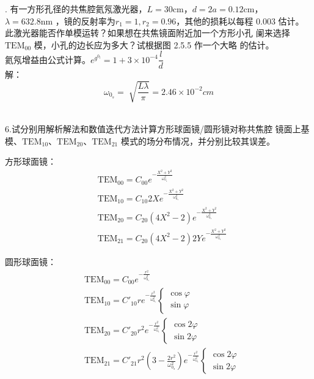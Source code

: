 \documentclass[12pt]{article}
\begin{document}
{. 有一方形孔径的共焦腔氦氖激光器，$L=30\si{\cm}$，$d=2a=0.12\si{\cm}$，
$\lambda=632.8\si{\nm}$ ，镜的反射率为$r_1=1,r_2=0.96$，其他的损耗以每程 0.003 估计。
此激光器能否作单模运转？如果想在共焦镜面附近加一个方形小孔
阑来选择$\mathrm{TEM_{00}}$ 模，小孔的边长应为多大？试根据图 2.5.5 作一个大略
的估计。\\氦氖增益由公式计算。$ e^{g^{0_l}}=1+3\times10^{-4}\dfrac{l}{d} $
}
{\kaishu\noindent
\\解：
\[
	\omega_{0_s}=\sqrt[]{\dfrac{L\lambda}{\pi} }=2.46\times10^{-2}\si{cm}
\]
\\}

{\fangsong
6.试分别用解析解法和数值迭代方法计算方形球面镜/圆形镜对称共焦腔
镜面上基模、$\mathrm{TEM_{10}}$、$\mathrm{TEM_{20}}$、$\mathrm{TEM_{21}}$
模式的场分布情况，并分别比较其误差。
}
{\kaishu\noindent
\par 方形球面镜：
\begin{align*}
	  &\mathrm{TEM_{00}}=C_{00}e^{-\frac{X^2+Y^2}{\omega^2_{0_s}} }
	\\&\mathrm{TEM_{10}}=C_{10} 2X e^{-\frac{X^2+Y^2}{\omega^2_{0_s}} }
	\\&\mathrm{TEM_{20}}=C_{20} \left( 4X^2-2 \right) e^{-\frac{X^2+Y^2}{\omega^2_{0_s}} } 
	\\&\mathrm{TEM_{21}}=C_{20} \left( 4X^2-2 \right)2Y e^{-\frac{X^2+Y^2}{\omega^2_{0_s}} } 
\end{align*}
\par 圆形球面镜：
\begin{align*}
	&\mathrm{TEM_{00}}=C_{00}e^{-\frac{r^2}{\omega^2_{0_s}} }
  \\&\mathrm{TEM_{10}}=C'_{10}re^{-\frac{r^2}{\omega^2_{0_s}} }
  \begin{cases}
	  \cos\varphi\\\sin\varphi
  \end{cases}
  \\&\mathrm{TEM_{20}}=C'_{20}r^2e^{-\frac{r^2}{\omega^2_{0_s}} }
  \begin{cases}
	  \cos2\varphi\\\sin2\varphi
  \end{cases}
  \\&\mathrm{TEM_{21}}=C'_{21}r^2 \left( 3-\frac{2r^2}{\omega^2_{0_s}}  \right)  e^{-\frac{r^2}{\omega^2_{0_s}} }
  \begin{cases}
	  \cos2\varphi\\\sin2\varphi
  \end{cases}
\end{align*}
\\}
\end{document}
